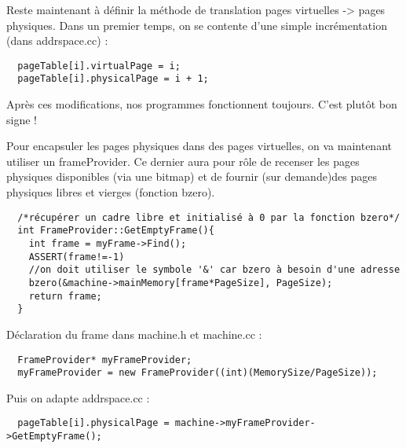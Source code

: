 \documentclass[a4paper,10pt]{report}
\begin{document}
  Reste maintenant à définir la méthode de translation pages virtuelles -> pages physiques. Dans un premier temps, on se contente d'une simple incrémentation (dans addrspace.cc) :

  \begin{lstlisting}
  pageTable[i].virtualPage = i;
  pageTable[i].physicalPage = i + 1;
  \end{lstlisting}

  Après ces modifications, nos programmes fonctionnent toujours. C'est plutôt bon signe !

  Pour encapsuler les pages physiques dans des pages virtuelles, on va maintenant utiliser un frameProvider. Ce dernier aura pour rôle de recenser les pages physiques disponibles (via une bitmap) et de fournir (sur demande)des pages physiques libres et vierges (fonction bzero).

  \begin{lstlisting}
  /*récupérer un cadre libre et initialisé à 0 par la fonction bzero*/
  int FrameProvider::GetEmptyFrame(){
    int frame = myFrame->Find();
    ASSERT(frame!=-1)
    //on doit utiliser le symbole '&' car bzero à besoin d'une adresse
    bzero(&machine->mainMemory[frame*PageSize], PageSize);
    return frame;
  }
  \end{lstlisting}
  \newpage
  Déclaration du frame dans machine.h et machine.cc :

  \begin{lstlisting}
  FrameProvider* myFrameProvider;
  myFrameProvider = new FrameProvider((int)(MemorySize/PageSize));
  \end{lstlisting}

  Puis on adapte addrspace.cc :

  \begin{lstlisting}
  pageTable[i].physicalPage = machine->myFrameProvider->GetEmptyFrame();
  \end{lstlisting}
\end{document}
